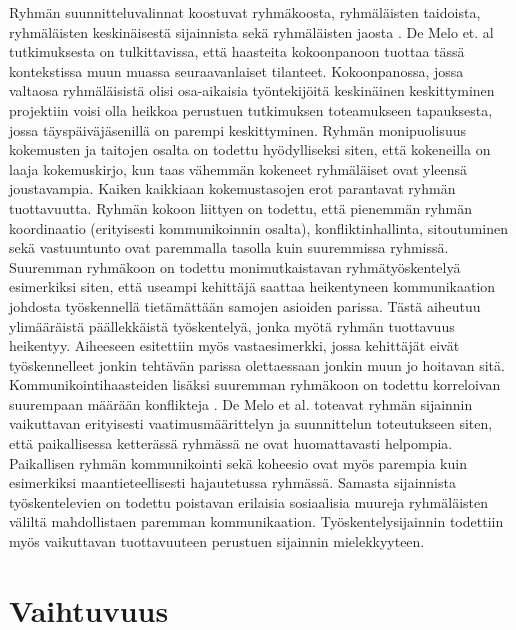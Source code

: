 Ryhmän suunnitteluvalinnat koostuvat ryhmäkoosta, ryhmäläisten taidoista, ryhmäläisten keskinäisestä sijainnista sekä ryhmäläisten jaosta \cite{DEOMELO2013412}. De Melo et. al \cite{DEOMELO2013412} tutkimuksesta on tulkittavissa, että haasteita kokoonpanoon tuottaa tässä kontekstissa muun muassa seuraavanlaiset tilanteet. Kokoonpanossa, jossa valtaosa ryhmäläisistä olisi osa-aikaisia työntekijöitä keskinäinen keskittyminen projektiin voisi olla heikkoa perustuen tutkimuksen toteamukseen tapauksesta, jossa täyspäiväjäsenillä on parempi keskittyminen. Ryhmän monipuolisuus kokemusten ja taitojen osalta on todettu hyödylliseksi siten, että kokeneilla on laaja kokemuskirjo, kun taas vähemmän kokeneet ryhmäläiset ovat yleensä joustavampia. Kaiken kaikkiaan kokemustasojen erot parantavat ryhmän tuottavuutta. Ryhmän kokoon liittyen on todettu, että pienemmän ryhmän koordinaatio (erityisesti kommunikoinnin osalta), konfliktinhallinta, sitoutuminen sekä vastuuntunto ovat paremmalla tasolla kuin suuremmissa ryhmissä. Suuremman ryhmäkoon on todettu monimutkaistavan ryhmätyöskentelyä esimerkiksi siten, että useampi kehittäjä saattaa heikentyneen kommunikaation johdosta työskennellä tietämättään samojen asioiden parissa. Tästä aiheutuu ylimääräistä päällekkäistä työskentelyä, jonka myötä ryhmän tuottavuus heikentyy. Aiheeseen esitettiin myös vastaesimerkki, jossa kehittäjät eivät työskennelleet jonkin tehtävän parissa olettaessaan jonkin muun jo hoitavan sitä. Kommunikointihaasteiden lisäksi suuremman ryhmäkoon on todettu korreloivan suurempaan määrään konflikteja \cite{SELLERISILVA201520, DEOMELO2013412}. De Melo et al. \cite{DEOMELO2013412} toteavat ryhmän sijainnin vaikuttavan erityisesti vaatimusmäärittelyn ja suunnittelun toteutukseen siten, että paikallisessa ketterässä ryhmässä ne ovat huomattavasti helpompia. Paikallisen ryhmän kommunikointi sekä koheesio ovat myös parempia kuin esimerkiksi maantieteellisesti hajautetussa ryhmässä. Samasta sijainnista työskentelevien on todettu poistavan erilaisia sosiaalisia muureja ryhmäläisten väliltä mahdollistaen paremman kommunikaation. Työskentelysijainnin todettiin myös vaikuttavan tuottavuuteen perustuen sijainnin mielekkyyteen.

\section{Vaihtuvuus}

